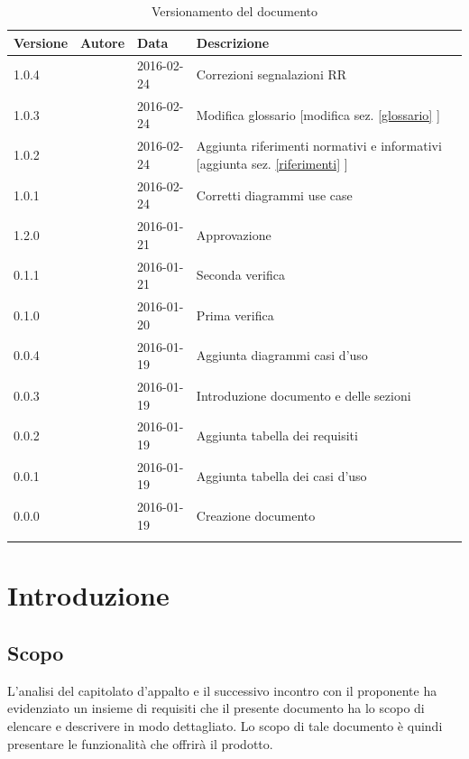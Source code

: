 \documentclass[12pt,a4paper]{article}
\begin{document}
\begin{center}
	\begin{longtable}[H]{p{} p{} p{} p{}}
		\toprule
		\textbf{Versione}	&	\textbf{Autore}	&	\textbf{Data}	&	\textbf{Descrizione}\\*
		\midrule
		\midrule
		1.0.4 & \AVI{} & 2016-02-24 &  Correzioni segnalazioni RR \\*
		\midrule
		1.0.3 & \IB{} & 2016-02-24 &  Modifica glossario [modifica sez. \ref{glossario} ] \\*
		\midrule
		1.0.2 & \IB{} & 2016-02-24 &  Aggiunta riferimenti normativi e informativi [aggiunta sez. \ref{riferimenti} ] \\*
		\midrule
		1.0.1 & \NDC{} & 2016-02-24 &  Corretti diagrammi use case \\*
		\midrule
		1.2.0 & \NDC{} & 2016-01-21 &  Approvazione \\*
		\midrule
		0.1.1 & \IB{} & 2016-01-21 &  Seconda verifica \\*
		\midrule
		0.1.0 & \AVI{} & 2016-01-20 &  Prima verifica \\*
		\midrule
		0.0.4 & \TP{} & 2016-01-19 & Aggiunta diagrammi casi d'uso\\*
		\midrule
		0.0.3 & \AVE{} & 2016-01-19 &  Introduzione documento e delle sezioni  \\*
		\midrule
		0.0.2 & \AB{} & 2016-01-19 &  Aggiunta tabella dei requisiti \\*
		\midrule
		0.0.1 & \WS{} & 2016-01-19 &  Aggiunta tabella dei casi d'uso \\*
		\midrule
		0.0.0 & \NDC{} & 2016-01-19 &  Creazione documento \\*
		\bottomrule
		\caption{Versionamento del documento}
		\label{tabVers1}
	\end{longtable}
\end{center}

\newpage
\tableofcontents
\newpage
\listoftables
\listoffigures
\newpage

\section{Introduzione}

\subsection{Scopo}
L’analisi del capitolato d’appalto e il successivo incontro con il proponente ha evidenziato un insieme di requisiti che il presente documento ha lo scopo di elencare e descrivere in modo dettagliato. Lo scopo di tale documento è quindi presentare le funzionalità che offrirà il prodotto.
\end{document}
